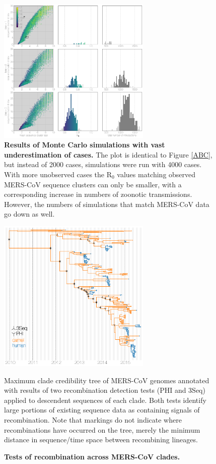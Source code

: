 \documentclass[11pt,oneside,letterpaper]{article}
\begin{document}
\begin{figure}[h]
\centering
	\includegraphics[width=0.65\textwidth]{figures/mers_epi_4000c.png}
	\caption{\textbf{Results of Monte Carlo simulations with vast underestimation of cases.}
The plot is identical to Figure \ref{ABC}, but instead of 2000 cases,
simulations were run with 4000 cases.
With more unobserved cases the R$_{0}$ values matching observed MERS-CoV sequence clusters can only be smaller, with a corresponding increase in numbers of zoonotic transmissions.
However, the numbers of simulations that match MERS-CoV data go down as well.
	}
	\label{extra_cases}
\end{figure}

\begin{figure}[h]
\centering
	\includegraphics[width=0.65\textwidth]{figures/mers_recombination.png}
	\caption{\textbf{Tests of recombination across MERS-CoV clades.}}
Maximum clade credibility tree of MERS-CoV genomes annotated with results of two recombination detection tests (PHI and 3Seq) applied to descendent sequences of each clade.
Both tests identify large portions of existing sequence data as containing signals of recombination.
Note that markings do not indicate where recombinations have occurred on the tree, merely the minimum distance in sequence/time space between recombining lineages.
	\label{recombination_tree}
\end{figure}
\end{document}
